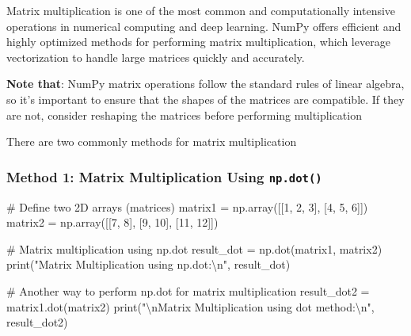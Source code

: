 \documentclass[
  letterpaper,
  DIV=11,
  numbers=noendperiod]{scrreprt}
\newenvironment{Shaded}{\begin{snugshade}}{\end{snugshade}}
\newcommand{\BuiltInTok}[1]{\textcolor[rgb]{0.00,0.23,0.31}{#1}}
\newcommand{\CharTok}[1]{\textcolor[rgb]{0.13,0.47,0.30}{#1}}
\newcommand{\CommentTok}[1]{\textcolor[rgb]{0.37,0.37,0.37}{#1}}
\newcommand{\DecValTok}[1]{\textcolor[rgb]{0.68,0.00,0.00}{#1}}
\newcommand{\NormalTok}[1]{\textcolor[rgb]{0.00,0.23,0.31}{#1}}
\newcommand{\OperatorTok}[1]{\textcolor[rgb]{0.37,0.37,0.37}{#1}}
\newcommand{\StringTok}[1]{\textcolor[rgb]{0.13,0.47,0.30}{#1}}
\begin{document}
Matrix multiplication is one of the most common and computationally
intensive operations in numerical computing and deep learning. NumPy
offers efficient and highly optimized methods for performing matrix
multiplication, which leverage vectorization to handle large matrices
quickly and accurately.

\textbf{Note that}: NumPy matrix operations follow the standard rules of
linear algebra, so it's important to ensure that the shapes of the
matrices are compatible. If they are not, consider reshaping the
matrices before performing multiplication

There are two commonly methods for matrix multiplication

\hypertarget{method-1-matrix-multiplication-using-np.dot}{%
\subsubsection{\texorpdfstring{Method 1: Matrix Multiplication Using
\texttt{np.dot()}}{Method 1: Matrix Multiplication Using np.dot()}}\label{method-1-matrix-multiplication-using-np.dot}}

\begin{Shaded}
\begin{Highlighting}[]
\CommentTok{\# Define two 2D arrays (matrices)}
\NormalTok{matrix1 }\OperatorTok{=}\NormalTok{ np.array([[}\DecValTok{1}\NormalTok{, }\DecValTok{2}\NormalTok{, }\DecValTok{3}\NormalTok{], }
\NormalTok{                    [}\DecValTok{4}\NormalTok{, }\DecValTok{5}\NormalTok{, }\DecValTok{6}\NormalTok{]])}
\NormalTok{matrix2 }\OperatorTok{=}\NormalTok{ np.array([[}\DecValTok{7}\NormalTok{, }\DecValTok{8}\NormalTok{], }
\NormalTok{                    [}\DecValTok{9}\NormalTok{, }\DecValTok{10}\NormalTok{], }
\NormalTok{                    [}\DecValTok{11}\NormalTok{, }\DecValTok{12}\NormalTok{]])}

\CommentTok{\# Matrix multiplication using np.dot}
\NormalTok{result\_dot }\OperatorTok{=}\NormalTok{ np.dot(matrix1, matrix2)}
\BuiltInTok{print}\NormalTok{(}\StringTok{"Matrix Multiplication using np.dot:}\CharTok{\textbackslash{}n}\StringTok{"}\NormalTok{, result\_dot)}

\CommentTok{\# Another way to perform np.dot for matrix multiplication}
\NormalTok{result\_dot2 }\OperatorTok{=}\NormalTok{ matrix1.dot(matrix2)}
\BuiltInTok{print}\NormalTok{(}\StringTok{"}\CharTok{\textbackslash{}n}\StringTok{Matrix Multiplication using dot method:}\CharTok{\textbackslash{}n}\StringTok{"}\NormalTok{, result\_dot2)}
\end{Highlighting}
\end{Shaded}
\end{document}
